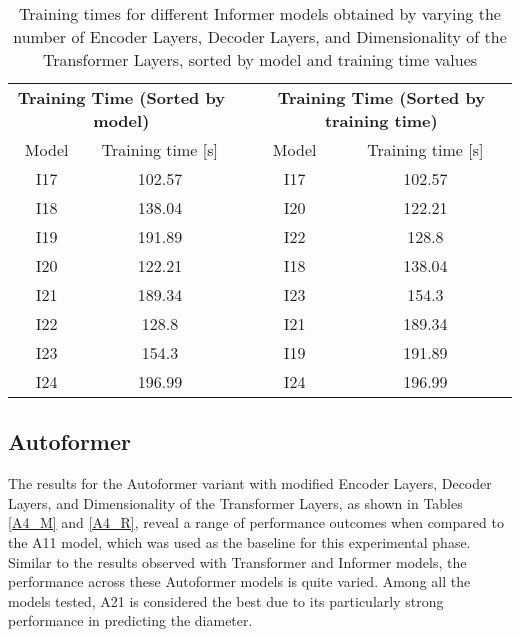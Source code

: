 \begin{table}[]
    \begin{tabular}{ccccc}
    \multicolumn{2}{c}{\textbf{Training   Time (Sorted by model)}} &  & \multicolumn{2}{c}{\textbf{Training Time (Sorted   by training time)}} \\
    Model             & Training time {[}s{]}                      &  & Model                 & Training time {[}s{]}                          \\
    I17               & \cellcolor[HTML]{63BE7B}102.57             &  & I17                   & \cellcolor[HTML]{63BE7B}102.57                 \\
    I18               & \cellcolor[HTML]{E1E282}138.04             &  & I20                   & \cellcolor[HTML]{A9D27F}122.21                 \\
    I19               & \cellcolor[HTML]{F9776E}191.89             &  & I22                   & \cellcolor[HTML]{C0D980}128.8                  \\
    I20               & \cellcolor[HTML]{A9D27F}122.21             &  & I18                   & \cellcolor[HTML]{E1E282}138.04                 \\
    I21               & \cellcolor[HTML]{FA7D6F}189.34             &  & I23                   & \cellcolor[HTML]{FED781}154.3                  \\
    I22               & \cellcolor[HTML]{C0D980}128.8              &  & I21                   & \cellcolor[HTML]{FA7D6F}189.34                 \\
    I23               & \cellcolor[HTML]{FED781}154.3              &  & I19                   & \cellcolor[HTML]{F9776E}191.89                 \\
    I24               & \cellcolor[HTML]{F8696B}196.99             &  & I24                   & \cellcolor[HTML]{F8696B}196.99                
    \end{tabular}
    \caption{Training times for different Informer models obtained by varying the number of Encoder Layers, Decoder Layers, and Dimensionality of the Transformer Layers, sorted by model and training time values}
    \label{I4_T}
    \end{table}

\subsection{Autoformer}
The results for the Autoformer variant with modified Encoder Layers, Decoder Layers, and Dimensionality of the Transformer Layers, as shown in Tables \ref{A4_M} and \ref{A4_R}, reveal a range of performance outcomes when compared to the A11 model, which was used as the baseline for this experimental phase. Similar to the results observed with Transformer and Informer models, the performance across these Autoformer models is quite varied. Among all the models tested, A21 is considered the best due to its particularly strong performance in predicting the diameter.

